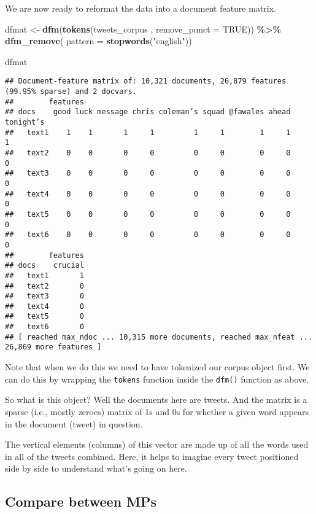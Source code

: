 \documentclass[
]{article}
\newenvironment{Shaded}{\begin{snugshade}}{\end{snugshade}}
\newcommand{\AttributeTok}[1]{\textcolor[rgb]{0.13,0.29,0.53}{#1}}
\newcommand{\ConstantTok}[1]{\textcolor[rgb]{0.56,0.35,0.01}{#1}}
\newcommand{\FunctionTok}[1]{\textcolor[rgb]{0.13,0.29,0.53}{\textbf{#1}}}
\newcommand{\NormalTok}[1]{#1}
\newcommand{\OtherTok}[1]{\textcolor[rgb]{0.56,0.35,0.01}{#1}}
\newcommand{\SpecialCharTok}[1]{\textcolor[rgb]{0.81,0.36,0.00}{\textbf{#1}}}
\newcommand{\StringTok}[1]{\textcolor[rgb]{0.31,0.60,0.02}{#1}}
\begin{document}
We are now ready to reformat the data into a document feature matrix.

\begin{Shaded}
\begin{Highlighting}[]
\NormalTok{dfmat }\OtherTok{\textless{}{-}} \FunctionTok{dfm}\NormalTok{(}\FunctionTok{tokens}\NormalTok{(tweets\_corpus , }\AttributeTok{remove\_punct =} \ConstantTok{TRUE}\NormalTok{)) }\SpecialCharTok{\%\textgreater{}\%}
         \FunctionTok{dfm\_remove}\NormalTok{( }\AttributeTok{pattern =} \FunctionTok{stopwords}\NormalTok{(}\StringTok{"english"}\NormalTok{))}
            
\NormalTok{dfmat}
\end{Highlighting}
\end{Shaded}

\begin{verbatim}
## Document-feature matrix of: 10,321 documents, 26,879 features (99.95% sparse) and 2 docvars.
##        features
## docs    good luck message chris coleman’s squad @fawales ahead tonight’s
##   text1    1    1       1     1         1     1        1     1         1
##   text2    0    0       0     0         0     0        0     0         0
##   text3    0    0       0     0         0     0        0     0         0
##   text4    0    0       0     0         0     0        0     0         0
##   text5    0    0       0     0         0     0        0     0         0
##   text6    0    0       0     0         0     0        0     0         0
##        features
## docs    crucial
##   text1       1
##   text2       0
##   text3       0
##   text4       0
##   text5       0
##   text6       0
## [ reached max_ndoc ... 10,315 more documents, reached max_nfeat ... 26,869 more features ]
\end{verbatim}

Note that when we do this we need to have tokenized our corpus object
first. We can do this by wrapping the \texttt{tokens} function inside
the \texttt{dfm()} function as above.

So what is this object? Well the documents here are tweets. And the
matrix is a sparse (i.e., mostly zeroes) matrix of 1s and 0s for whether
a given word appears in the document (tweet) in question.

The vertical elements (columns) of this vector are made up of all the
words used in all of the tweets combined. Here, it helps to imagine
every tweet positioned side by side to understand what's going on here.

\subsection{Compare between MPs}\label{compare-between-mps}
\end{document}
